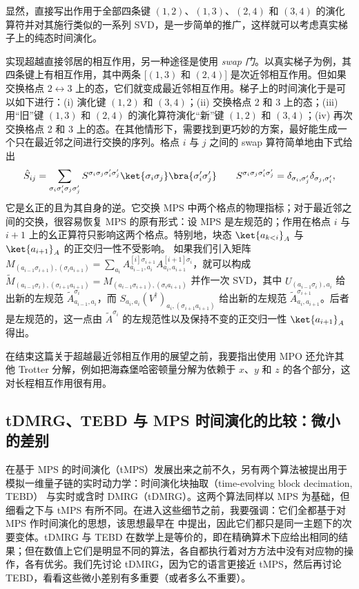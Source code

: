 显然，直接写出作用于全部四条键 $(1,2)$、$(1,3)$、$(2,4)$ 和 $(3,4)$ 的演化算符并对其施行类似的一系列 SVD，是一步简单的推广，这样就可以考虑真实梯子上的纯态时间演化。 

实现超越直接邻居的相互作用，另一种途径是使用 {\em swap 门}\cite{Stoudenmire10}。以真实梯子为例，其四条键上有相互作用，其中两条 [$(1,3)$ 和 $(2,4)$] 是次近邻相互作用。但如果交换格点 $2 \leftrightarrow 3$ 上的态，它们就变成最近邻相互作用。梯子上的时间演化于是可以如下进行：(i) 演化键 $(1,2)$ 和 $(3,4)$；(ii) 交换格点 2 和 3 上的态；(iii) 用``旧''键 $(1,3)$ 和 $(2,4)$ 的演化算符演化``新''键 $(1,2)$ 和 $(3,4)$；(iv) 再次交换格点 2 和 3 上的态。在其他情形下，需要找到更巧妙的方案，最好能生成一个只在最近邻之间进行交换的序列。格点 $i$ 与 $j$ 之间的 swap 算符简单地由下式给出
\begin{equation}
\hat{S}_{ij} = \sum_{\sigma_i\sigma'_i \sigma_j\sigma'_j} S^{\sigma_i\sigma_j \sigma'_i \sigma'_j} \ket{\sigma_i\sigma_j}\bra{\sigma'_i\sigma'_j} \quad\quad 
S^{\sigma_i\sigma_j \sigma'_i \sigma'_j} = \delta_{\sigma_i,\sigma'_j} \delta_{\sigma_j,\sigma'_i},
\end{equation}
它是幺正的且为其自身的逆。它交换 MPS 中两个格点的物理指标；对于最近邻之间的交换，很容易恢复 MPS 的原有形式：设 MPS 是左规范的；作用在格点 $i$ 与 $i+1$ 上的幺正算符只影响这两个格点。特别地，块态 $\ket{a_{k<i}}_A$ 与 $\ket{a_{i+1}}_A$ 的正交归一性不受影响。
如果我们引入矩阵 $M_{(a_{i-1}\sigma_{i+1}),(\sigma_i a_{i+1})} = \sum_{a_i} A^{[i]\sigma_{i+1}}_{a_{i-1},a_i} A^{[i+1]\sigma_i}_{a_i,a_{i+1}}$，就可以构成 $\tilde{M}_{(a_{i-1}\sigma_i),(\sigma_{i+1}a_{i+1})}=M_{(a_{i-1}\sigma_{i+1}),(\sigma_i a_{i+1})}$ 并作一次 SVD，其中 $U_{(a_{i-1}\sigma_i),a_i}$ 给出新的左规范 $\tilde{A}^{\sigma_i}_{a_{i-1},a_i}$，而
$S_{a_i,a_i} (V^\dagger)_{a_i,(\sigma_{i+1}a_{i+1})}$ 给出新的左规范 $\tilde{A}^{\sigma_{i+1}}_{a_{i},a_{i+1}}$。后者是左规范的，这一点由 $\tilde{A}^{\sigma_i}$ 的左规范性以及保持不变的正交归一性 $\ket{a_{i+1}}_A$ 得出。

在结束这篇关于超越最近邻相互作用的展望之前，我要指出使用 MPO 还允许其他 Trotter 分解，例如把海森堡哈密顿量分解为依赖于 $x$、$y$ 和 $z$ 的各个部分，这对长程相互作用很有用\cite{VerstraetePirvu08}。 
 

\subsection{tDMRG、TEBD 与 MPS 时间演化的比较：微小的差别}
在基于 MPS 的时间演化（tMPS）发展出来之前不久，另有两个算法被提出用于模拟一维量子链的实时动力学：时间演化块抽取（time-evolving block decimation, TEBD）\cite{Vidal03a,Vidal04b} 与实时或含时 DMRG（tDMRG）\cite{Daley04,WhiteFeiguin04}。这两个算法同样以 MPS 为基础，但细看之下与 tMPS 有所不同。在进入这些细节之前，我要强调：它们全都基于对 MPS 作时间演化的思想，该思想最早在 \cite{Vidal03a,Vidal04b} 中提出，因此它们都只是同一主题下的次要变体。tDMRG 与 TEBD 在数学上是等价的，即在精确算术下应给出相同的结果；但在数值上它们是明显不同的算法，各自都执行着对方方法中没有对应物的操作，各有优劣。我们先讨论 tDMRG，因为它的语言更接近 tMPS，然后再讨论 TEBD，看看这些微小差别有多重要（或者多么不重要）。

